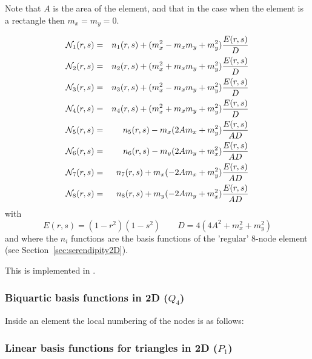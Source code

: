 Note that $A$ is the area of the element, and that in the case when 
the element is a rectangle then $m_x=m_y=0$.

\begin{eqnarray}
{\mathcal{N}}_1(r,s)&=& n_1(r,s) +(m_x^2 - m_xm_y + m_y^2)\frac{E(r,s)}{D} \nonumber\\
{\mathcal{N}}_2(r,s)&=& n_2(r,s) +(m_x^2 + m_xm_y + m_y^2)\frac{E(r,s)}{D} \nonumber\\
{\mathcal{N}}_3(r,s)&=& n_3(r,s) +(m_x^2 - m_xm_y + m_y^2)\frac{E(r,s)}{D} \nonumber\\
{\mathcal{N}}_4(r,s)&=& n_4(r,s) +(m_x^2 + m_xm_y + m_y^2)\frac{E(r,s)}{D} \nonumber\\
{\mathcal{N}}_5(r,s)&=& n_5(r,s) -m_x(2Am_x+m_y^2)\frac{E(r,s)}{AD} \nonumber\\
{\mathcal{N}}_6(r,s)&=& n_6(r,s) -m_y(2Am_y+m_x^2)\frac{E(r,s)}{AD} \nonumber\\
{\mathcal{N}}_7(r,s)&=& n_7(r,s) +m_x(-2Am_x+m_y^2)\frac{E(r,s)}{AD} \nonumber\\
{\mathcal{N}}_8(r,s)&=& n_8(r,s) +m_y(-2Am_y+m_x^2)\frac{E(r,s)}{AD} \nonumber
\end{eqnarray}
with 
\[
E(r,s)=(1-r^2)(1-s^2)
\qquad
D=4(4A^2+m_x^2+m_y^2)
\]
and where the $n_i$ functions are the basis functions of the 'regular' 
8-node element (see Section~\ref{sec:serendipity2D}).

This is implemented in .









\subsubsection{Biquartic basis functions in 2D ($Q_4$)}

Inside an element the local numbering of the nodes is as follows:



\subsubsection{Linear basis functions for triangles in 2D ($P_1$)}\label{ss:p1}



